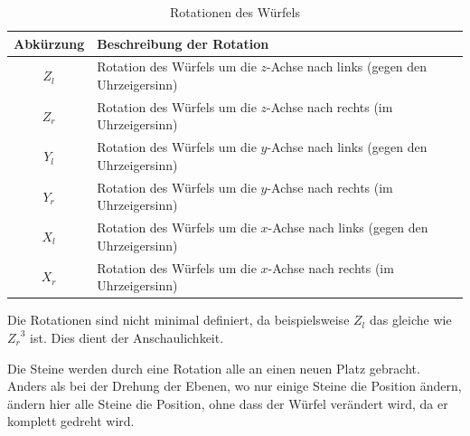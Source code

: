 \documentclass[12pt,a4paper, usenames, dvipsnames]{article}
\begin{document}
\begin{table}[H]

\begin{tabular}{cl}
Abkürzung & Beschreibung der Rotation \\
\hline
$Z_l$ & Rotation des Würfels um die $z$-Achse nach links (gegen den Uhrzeigersinn)\\

$Z_r$ & Rotation des Würfels um die $z$-Achse nach rechts (im Uhrzeigersinn)  \\

$Y_l$ & Rotation des Würfels um die $y$-Achse nach links (gegen den Uhrzeigersinn)\\

$Y_r$ & Rotation des Würfels um die $y$-Achse nach rechts (im Uhrzeigersinn)  \\

$X_l$ & Rotation des Würfels um die $x$-Achse nach links (gegen den Uhrzeigersinn)\\

$X_r$ & Rotation des Würfels um die $x$-Achse nach rechts (im Uhrzeigersinn) \\

\end{tabular} 
\caption[Rotationen des Würfels]{Rotationen des Würfels}
\end{table}

Die Rotationen sind nicht minimal definiert, da beispielsweise $Z_l$ das gleiche wie ${Z_r}^3$ ist. Dies dient der Anschaulichkeit. 

Die Steine werden durch eine Rotation alle an einen neuen Platz gebracht. Anders als bei der Drehung der Ebenen, wo nur einige Steine die Position ändern, ändern hier alle Steine die Position, ohne dass der Würfel verändert wird, da er komplett gedreht wird. 
\end{document}
